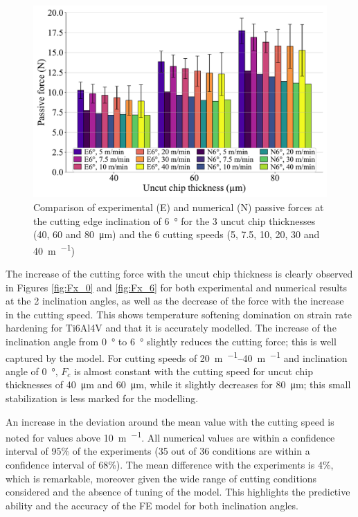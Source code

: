 \documentclass[preprint,12pt,times]{elsarticle}
\begin{document}
\begin{figure}[!h]
\centering
\includegraphics[width = 140 mm]{Figures/Fz_6}
\caption{Comparison of experimental (E) and numerical (N) passive forces at the cutting edge inclination of \qty{6}{\degree} for the 3 uncut chip thicknesses (40, 60 and \qty{80}{\um}) and the 6 cutting speeds (5, 7.5, 10, 20, 30 and \qty{40}{\m\per\min})}
\label{fig:Fz_6}
\end{figure}

The increase of the cutting force with the uncut chip thickness is clearly observed in Figures \ref{fig:Fx_0} and \ref{fig:Fx_6} for both experimental and numerical results at the 2 inclination angles, as well as the decrease of the force with the increase in the cutting speed. This shows temperature softening domination on strain rate hardening for Ti6Al4V and that it is accurately modelled. The increase of the inclination angle from \qty{0}{\degree} to \qty{6}{\degree} slightly reduces the cutting force; this is well captured by the model. For cutting speeds of \qtyrange{20}{40}{\m\per\min} and inclination angle of \qty{0}{\degree}, $F_c$ is almost constant with the cutting speed for uncut chip thicknesses of \qty{40}{\um} and \qty{60}{\um}, while it slightly decreases for \qty{80}{\um}; this small stabilization is less marked for the modelling.

An increase in the deviation around the mean value with the cutting speed is noted for values above \qty{10}{\m\per\min}. All numerical values are within a confidence interval of 95\% of the experiments (35 out of 36 conditions are within a confidence interval of 68\%). The mean difference with the experiments is 4\%, which is remarkable, moreover given the wide range of cutting conditions considered and the absence of tuning of the model. This highlights the predictive ability and the accuracy of the FE model for both inclination angles.
\end{document}
